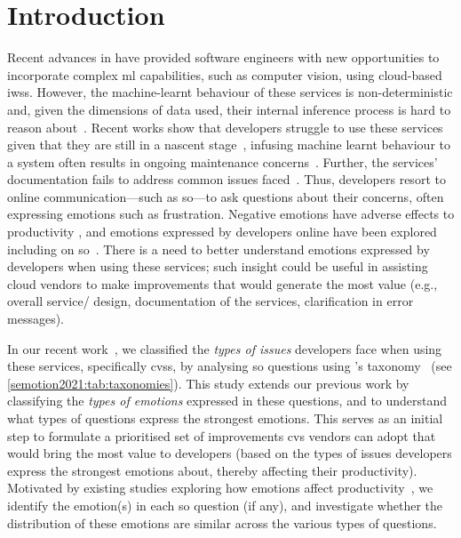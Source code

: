 \section{Introduction}
\label{semotion2021:sec:introduction}

Recent advances in  have provided software engineers with new opportunities to incorporate complex \gls{ml} capabilities, such as computer vision, using cloud-based \glspl{iws}. 
However, the machine-learnt behaviour of these services is  non-deterministic and, given the dimensions of data used, their internal inference process is hard to reason about~\citep{Cummaudo:2019icsme}. Recent works show that developers struggle to use these services given that they are still in a nascent stage~\citep{Cummaudo:2020icse}, infusing machine learnt behaviour to a system often results in ongoing maintenance concerns~\citep{Sculley2015}. Further, the services' documentation fails to address common issues faced~\citep{Cummaudo:2020icse}.
Thus, developers resort to online communication---such as \gls{so}---to ask questions about their concerns, often expressing emotions such as frustration. Negative emotions have adverse effects to productivity \citep{wrobel2013}, and emotions expressed by developers online have been explored~\citep{ortu2016} including on \gls{so}~\citep{novielli2018, calefato2018}. 
There is a need to better understand emotions expressed by developers when using these services; such insight could be useful in assisting cloud vendors to make improvements that would generate the most value (e.g., overall service/ design, documentation of the services, clarification in error messages).

In our recent work~\citep{Cummaudo:2020icse}, we classified the \textit{types of issues} developers face when using these services, specifically \glspl{cvs}, by analysing \SEMNumTotalPostsFromSO{} \gls{so} questions using \citeauthor{Beyer:2018fm}'s taxonomy~\citep{Beyer:2018fm} (see \cref{semotion2021:tab:taxonomies}). This study extends our previous work by classifying the \textit{types of emotions} expressed in these questions, and to understand what types of questions express the strongest emotions. This serves as an initial step to formulate a prioritised set of improvements \gls{cvs} vendors can adopt that would bring the most value to developers (based on the types of issues developers express the strongest emotions about, thereby affecting their productivity). Motivated by existing studies exploring how emotions affect productivity~\citep{murgia2014, ortu2016, gachechiladze2017}, we identify the emotion(s) in each \gls{so} question (if any), and investigate whether the distribution of these emotions are similar across the various types of questions.

